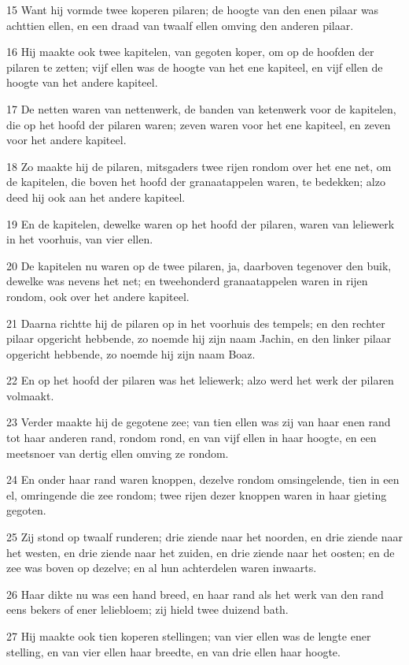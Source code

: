 \par 15 Want hij vormde twee koperen pilaren; de hoogte van den enen pilaar was achttien ellen, en een draad van twaalf ellen omving den anderen pilaar.
\par 16 Hij maakte ook twee kapitelen, van gegoten koper, om op de hoofden der pilaren te zetten; vijf ellen was de hoogte van het ene kapiteel, en vijf ellen de hoogte van het andere kapiteel.
\par 17 De netten waren van nettenwerk, de banden van ketenwerk voor de kapitelen, die op het hoofd der pilaren waren; zeven waren voor het ene kapiteel, en zeven voor het andere kapiteel.
\par 18 Zo maakte hij de pilaren, mitsgaders twee rijen rondom over het ene net, om de kapitelen, die boven het hoofd der granaatappelen waren, te bedekken; alzo deed hij ook aan het andere kapiteel.
\par 19 En de kapitelen, dewelke waren op het hoofd der pilaren, waren van leliewerk in het voorhuis, van vier ellen.
\par 20 De kapitelen nu waren op de twee pilaren, ja, daarboven tegenover den buik, dewelke was nevens het net; en tweehonderd granaatappelen waren in rijen rondom, ook over het andere kapiteel.
\par 21 Daarna richtte hij de pilaren op in het voorhuis des tempels; en den rechter pilaar opgericht hebbende, zo noemde hij zijn naam Jachin, en den linker pilaar opgericht hebbende, zo noemde hij zijn naam Boaz.
\par 22 En op het hoofd der pilaren was het leliewerk; alzo werd het werk der pilaren volmaakt.
\par 23 Verder maakte hij de gegotene zee; van tien ellen was zij van haar enen rand tot haar anderen rand, rondom rond, en van vijf ellen in haar hoogte, en een meetsnoer van dertig ellen omving ze rondom.
\par 24 En onder haar rand waren knoppen, dezelve rondom omsingelende, tien in een el, omringende die zee rondom; twee rijen dezer knoppen waren in haar gieting gegoten.
\par 25 Zij stond op twaalf runderen; drie ziende naar het noorden, en drie ziende naar het westen, en drie ziende naar het zuiden, en drie ziende naar het oosten; en de zee was boven op dezelve; en al hun achterdelen waren inwaarts.
\par 26 Haar dikte nu was een hand breed, en haar rand als het werk van den rand eens bekers of ener leliebloem; zij hield twee duizend bath.
\par 27 Hij maakte ook tien koperen stellingen; van vier ellen was de lengte ener stelling, en van vier ellen haar breedte, en van drie ellen haar hoogte.
